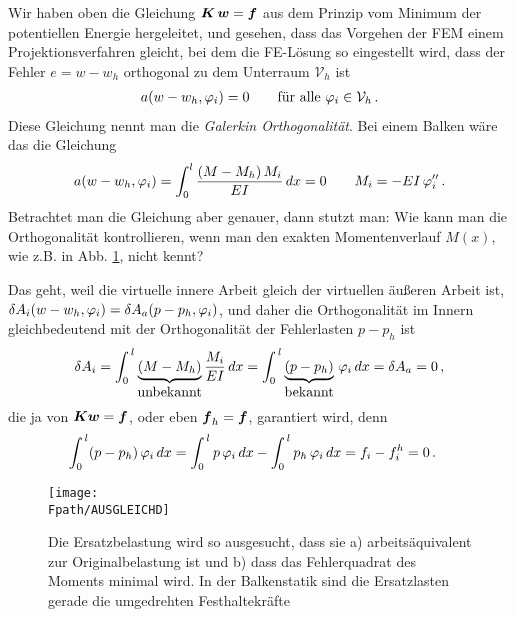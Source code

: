 Wir haben oben die Gleichung $\mbox{\boldmath $K$}\,\mbox{\boldmath $w$} = \mbox{\boldmath $f$}$ aus dem Prinzip vom Minimum der potentiellen
Energie hergeleitet, und gesehen, dass das Vorgehen der FEM einem Projektionsverfahren gleicht, bei dem die FE-L\"{o}sung so eingestellt wird, dass der Fehler $e = w - w_h$ orthogonal zu dem Unterraum $\mathcal{V}_h$ ist
\begin{align}
a(w -w_h,\varphi_i) = 0 \qquad \text{f\"{u}r alle $\varphi_i \in \mathcal{V}_h$}\,.
\end{align}
Diese Gleichung nennt man die {\em Galerkin Orthogonalit\"{a}t\/}. Bei einem Balken w\"{a}re das die Gleichung
\begin{align}
a(w - w_h,\varphi_i) = \int_{0}^{l}\frac{(M - M_h)\,M_i}{EI}\,dx = 0  \qquad M_i = - EI\,\varphi_i''\,.
\end{align}
Betrachtet man die Gleichung aber genauer, dann stutzt man: Wie kann man die Orthogonalit\"{a}t kontrollieren, wenn man den exakten Momentenverlauf $M(x)$, wie z.B. in  Abb. \ref{Ausgleich1}, nicht kennt?

Das geht, weil die virtuelle innere Arbeit gleich der virtuellen \"{a}u{\ss}eren Arbeit ist, $\delta A_i(w - w_h,\varphi_i) = \delta A_a(p - p_h,\varphi_i)$, und daher die Orthogonalit\"{a}t im Innern gleichbedeutend mit der Orthogonalit\"{a}t der Fehlerlasten $p - p_h$  ist
\begin{align}\label{Eq14}
\delta A_i = \int_0^{\,l} \underbrace{(M - M_h)}_{\mbox{unbekannt}}\frac{M_i}{EI} \,dx =
\int_0^{\,l} \underbrace{\vphantom{M_h}(p - p_h)}_{\mbox{bekannt}} \,\varphi_i\,dx = \delta
A_a = 0\,,
\end{align}
die ja von $\mbox{\boldmath $K$}\mbox{\boldmath $w$} = \mbox{\boldmath $f$}$, oder eben $\mbox{\boldmath $f$}_h = \mbox{\boldmath $f$}$, garantiert wird, denn
\begin{align}
\int_0^{\,l} (p - p_h) \,\varphi_i\,dx &= \int_0^{\,l} p \,\varphi_i\,dx - \int_0^{\,l} p_h \,\varphi_i\,dx
= f_i - f_i^h = 0\,.
\end{align}

\begin{figure}[tbp] \centering
\if {} \sidecaption \fi
\texttt{[image: \\Fpath/AUSGLEICHD]}
\caption{Die Ersatzbelastung wird so ausgesucht, dass sie a) arbeits\"{a}quivalent zur
Originalbelastung ist und b) dass das Fehlerquadrat des Moments minimal wird. In der
Balkenstatik sind die Ersatzlasten gerade die umgedrehten Festhaltekr\"{a}fte}
\label{Ausgleich1}
\end{figure}%

